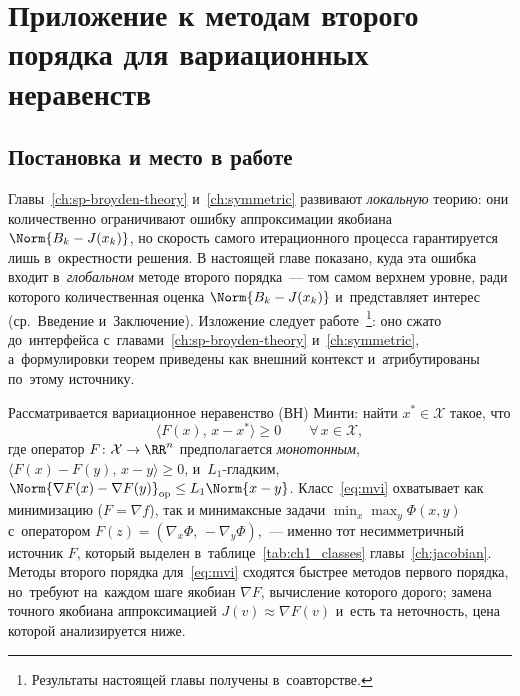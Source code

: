 
\chapter{Приложение к методам второго порядка для вариационных неравенств}\label{ch:viqa}

\section{Постановка и место в работе}\label{sec:viqa_setup}

Главы~\ref{ch:sp-broyden-theory} и~\ref{ch:symmetric} развивают
\emph{локальную} теорию: они количественно ограничивают ошибку
аппроксимации якобиана $\Norm{B_k - J(x_k)}$, но скорость самого
итерационного процесса гарантируется лишь в~окрестности решения. В
настоящей главе показано, куда эта ошибка входит в~\emph{глобальном}
методе второго порядка~--- том самом верхнем уровне, ради которого
количественная оценка $\Norm{B_k - J(x_k)}$ и~представляет интерес
(ср.~Введение и~Заключение). Изложение следует
работе~\cite{viqa2024}\footnote{Результаты настоящей главы получены
в~соавторстве.}: оно сжато до~интерфейса с~главами~\ref{ch:sp-broyden-theory}
и~\ref{ch:symmetric}, а~формулировки теорем приведены как внешний
контекст и~атрибутированы по~этому источнику.

Рассматривается вариационное неравенство (ВН) Минти: найти
$x^*\in\mathcal{X}$ такое, что
\begin{equation}\label{eq:mvi}
  \langle F(x),\, x - x^*\rangle \ge 0 \qquad \forall\, x\in\mathcal{X},
\end{equation}
где оператор $F\colon\mathcal{X}\to\RR^n$ предполагается
\emph{монотонным}, $\langle F(x)-F(y),\,x-y\rangle\ge 0$, и~$L_1$-гладким,
$\Norm{\nabla F(x)-\nabla F(y)}_{\mathrm{op}}\le L_1\Norm{x-y}$.
Класс~\eqref{eq:mvi} охватывает как минимизацию ($F=\nabla f$), так и
минимаксные задачи $\min_x\max_y\Phi(x,y)$ с~оператором
$F(z)=(\nabla_x\Phi,\,-\nabla_y\Phi)$,~--- именно тот несимметричный
источник $F$, который выделен в~таблице~\ref{tab:ch1_classes}
главы~\ref{ch:jacobian}. Методы второго порядка для~\eqref{eq:mvi}
сходятся быстрее методов первого порядка, но~требуют на~каждом шаге
якобиан $\nabla F$, вычисление которого дорого; замена точного якобиана
аппроксимацией $J(v)\approx\nabla F(v)$ и~есть та неточность, цена
которой анализируется ниже.

